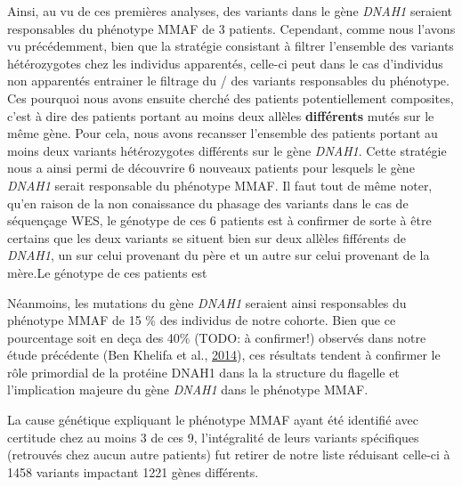 \documentclass[12pt,twoside]{reedthesis}
\theoremstyle{definition}
\theoremstyle{definition}
\theoremstyle{remark}
\begin{document}
  Ainsi, au vu de ces premières analyses, des variants dans le gène
  \emph{DNAH1} seraient responsables du phénotype MMAF de 3 patients.
  Cependant, comme nous l'avons vu précédemment, bien que la stratégie
  consistant à filtrer l'ensemble des variants hétérozygotes chez les
  individus apparentés, celle-ci peut dans le cas d'individus non
  apparentés entrainer le filtrage du / des variants responsables du
  phénotype. Ces pourquoi nous avons ensuite cherché des patients
  potentiellement composites, c'est à dire des patients portant au moins
  deux allèles \textbf{différents} mutés sur le même gène. Pour cela, nous
  avons recansser l'ensemble des patients portant au moins deux variants
  hétérozygotes différents sur le gène \emph{DNAH1}. Cette stratégie nous
  a ainsi permi de découvrire 6 nouveaux patients pour lesquels le gène
  \emph{DNAH1} serait responsable du phénotype MMAF. Il faut tout de même
  noter, qu'en raison de la non conaissance du phasage des variants dans
  le cas de séquençage WES, le génotype de ces 6 patients est à confirmer
  de sorte à être certains que les deux variants se situent bien sur deux
  allèles fifférents de \emph{DNAH1}, un sur celui provenant du père et un
  autre sur celui provenant de la mère.Le génotype de ces patients est
  
  Néanmoins, les mutations du gène \emph{DNAH1} seraient ainsi
  responsables du phénotype MMAF de 15 \% des individus de notre cohorte.
  Bien que ce pourcentage soit en deça des 40\% (TODO: à confirmer!)
  observés dans notre étude précédente (Ben Khelifa et al.,
  \protect\hyperlink{ref-BenKhelifa2014}{2014}), ces résultats tendent à
  confirmer le rôle primordial de la protéine DNAH1 dans la la structure
  du flagelle et l'implication majeure du gène \emph{DNAH1} dans le
  phénotype MMAF.
  
  La cause génétique expliquant le phénotype MMAF ayant été identifié avec
  certitude chez au moins 3 de ces 9, l'intégralité de leurs variants
  spécifiques (retrouvés chez aucun autre patients) fut retirer de notre
  liste réduisant celle-ci à 1458 variants impactant 1221 gènes
  différents.
  
  \newpage
  
\end{document}

